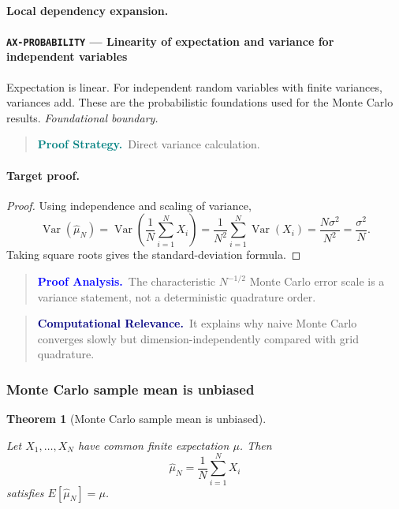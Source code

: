 \documentclass[10pt]{article}
\newcommand{\pidraw}[1]{\begingroup\urlstyle{tt}\nolinkurl{#1}\endgroup}
\newtheorem{theorem}{Theorem}[section]
\theoremstyle{definition}
\theoremstyle{remark}
\newenvironment{proofstrategy}
{\begin{quote}\small\noindent\textbf{\textcolor{teal}{Proof Strategy.}}\ }
{\end{quote}}
\newenvironment{proofanalysis}
{\begin{quote}\small\noindent\textbf{\textcolor{blue}{Proof Analysis.}}\ }
{\end{quote}}
\newenvironment{computationalrelevance}
{\begin{quote}\small\noindent\textbf{\textcolor{navy}{Computational Relevance.}}\ }
{\end{quote}}
\begin{document}
\paragraph{Local dependency expansion.}

\paragraph{\pidraw{AX-PROBABILITY} --- Linearity of expectation and variance for independent variables}
Expectation is linear. For independent random variables with finite variances, variances add. These are the probabilistic foundations used for the Monte Carlo results.
\textit{Foundational boundary.}

\begin{proofstrategy}Direct variance calculation.\end{proofstrategy}

\paragraph{Target proof.}

\begin{proof}

Using independence and scaling of variance,
\[
\operatorname{Var}(\widehat\mu_N)
=
\operatorname{Var}\left(\frac1N\sum_{i=1}^N X_i\right)
=
\frac1{N^2}\sum_{i=1}^N\operatorname{Var}(X_i)
=
\frac{N\sigma^2}{N^2}
=
\frac{\sigma^2}{N}.
\]
Taking square roots gives the standard-deviation formula.

\end{proof}

\begin{proofanalysis}The characteristic $N^{-1/2}$ Monte Carlo error scale is a variance statement, not a deterministic quadrature order.\end{proofanalysis}

\begin{computationalrelevance}It explains why naive Monte Carlo converges slowly but dimension-independently compared with grid quadrature.\end{computationalrelevance}

\subsubsection{Monte Carlo sample mean is unbiased}

\begin{theorem}[Monte Carlo sample mean is unbiased]\label{prf:THM-MC-UNBIASED}

Let $X_1,\ldots,X_N$ have common finite expectation $\mu$. Then
\[
\widehat\mu_N=\frac1N\sum_{i=1}^N X_i
\]
satisfies $E[\widehat\mu_N]=\mu$.

\end{theorem}
\end{document}
